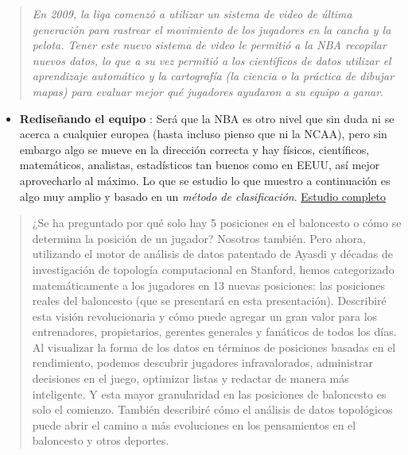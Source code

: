 \documentclass[]{article}
\providecommand{\tightlist}{%
  \setlength{\itemsep}{0pt}\setlength{\parskip}{0pt}}
\begin{document}
\begin{quote}
\emph{En 2009, la liga comenzó a utilizar un sistema de video de última
generación para rastrear el movimiento de los jugadores en la cancha y
la pelota. Tener este nuevo sistema de video le permitió a la NBA
recopilar nuevos datos, lo que a su vez permitió a los científicos de
datos utilizar el aprendizaje automático y la cartografía (la ciencia o
la práctica de dibujar mapas) para evaluar mejor qué jugadores ayudaron
a su equipo a ganar}.
\end{quote}

\begin{itemize}
\tightlist
\item
  \textbf{Rediseñando el equipo} : Será que la NBA es otro nivel que sin
  duda ni se acerca a cualquier europea (hasta incluso pienso que ni la
  NCAA), pero sin embargo algo se mueve en la dirección correcta y hay
  físicos, científicos, matemáticos, analistas, estadísticos tan buenos
  como en EEUU, así mejor aprovecharlo al máximo. Lo que se estudio lo
  que muestro a continuación es algo muy amplio y basado en un
  \emph{método de clasificación}.
  \href{http://www.sloansportsconference.com/wp-content/uploads/2012/03/Alagappan-Muthu-EOSMarch2012PPT.pdf?utm_source=twitter\&utm_medium=socialmedia\&utm_campaign=wiredplaybookclickthru}{Estudio
  completo}
\end{itemize}

\begin{quote}
¿Se ha preguntado por qué solo hay 5 posiciones en el baloncesto o cómo
se determina la posición de un jugador? Nosotros también. Pero ahora,
utilizando el motor de análisis de datos patentado de Ayasdi y décadas
de investigación de topología computacional en Stanford, hemos
categorizado matemáticamente a los jugadores en 13 nuevas posiciones:
las posiciones reales del baloncesto (que se presentará en esta
presentación). Describiré esta visión revolucionaria y cómo puede
agregar un gran valor para los entrenadores, propietarios, gerentes
generales y fanáticos de todos los días. Al visualizar la forma de los
datos en términos de posiciones basadas en el rendimiento, podemos
descubrir jugadores infravalorados, administrar decisiones en el juego,
optimizar listas y redactar de manera más inteligente. Y esta mayor
granularidad en las posiciones de baloncesto es solo el comienzo.
También describiré cómo el análisis de datos topológicos puede abrir el
camino a más evoluciones en los pensamientos en el baloncesto y otros
deportes.
\end{quote}
\end{document}
